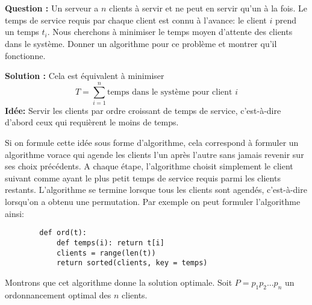 \documentclass[11pt]{article} %
\newenvironment{question}[1][\unskip]{%
	\par
	\noindent
	\textbf{Question #1:}
	\noindent}
{\medskip}
\newenvironment{solution}[1][\unskip]{%
	\par
	\noindent
	\textbf{Solution #1:}
	\noindent}
{\medskip}
\begin{document}
	\section{}
	\begin{question}
		Un serveur a $n$ clients à servir et ne peut en servir qu'un à la fois. Le temps de service requis par chaque client est connu à l'avance: le client $i$ prend un temps $t_i$. Nous cherchons à minimiser le temps moyen d'attente des clients dans le système. Donner un algorithme pour ce problème et montrer qu'il fonctionne.
	\end{question}
	\begin{solution}
		Cela est équivalent à minimiser
		$$T=\sum_{i=1}^n\text{temps dans le système pour client }i$$
		\textbf{Idée:} Servir les clients par ordre croissant de temps de service, c'est-à-dire d'abord ceux qui requièrent le moins de temps.
		
		Si on formule cette idée sous forme d'algorithme, cela correspond à formuler un algorithme vorace qui agende les clients l'un après l'autre sans jamais revenir sur ses choix précédents. A chaque étape, l'algorithme choisit simplement le client suivant comme ayant le plus petit temps de service requis parmi les clients restants. L'algorithme se termine lorsque tous les clients sont agendés, c'est-à-dire lorsqu'on a obtenu une permutation. Par exemple on peut formuler l'algorithme ainsi:
		
		\begin{lstlisting}
		def ord(t):
			def temps(i): return t[i]
			clients = range(len(t))
			return sorted(clients, key = temps)
		\end{lstlisting}
		
		Montrons que cet algorithme donne la solution optimale. Soit $P=p_1p_2...p_n$ un ordonnancement optimal des $n$ clients.
		

\end{solution}
\end{document}
